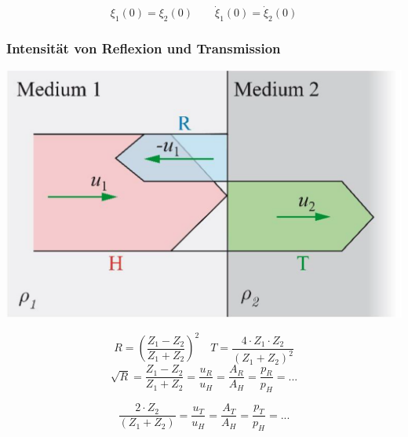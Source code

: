 $$ \xi_1(0) = \xi_2(0) \qquad \dot{\xi}_1(0) = \dot{\xi}_2(0) $$




\subsubsection{Intensität von Reflexion und Transmission}\label{Reflexionskoeffizient}

\begin{minipage}{0.48\linewidth}
	\includegraphics[width=0.9\linewidth]{Bilder/Wellen-Optik/reflexionskoeffizient_transmissionskoeffizient} \\
\end{minipage}
\hfill
\begin{minipage}{0.48\linewidth}
	$$ \boxed{ R = \left(  \frac{Z_1 - Z_2}{Z_1 + Z_2}  \right)^2  }  \quad \boxed{ T = \frac{ 4 \cdot Z_1 \cdot Z_2}{(Z_1 + Z_2)^2}   }$$
	$$ \boxed{ \sqrt{R} = \frac{Z_1 - Z_2}{Z_1 + Z_2} = \frac{u_R}{u_H} = \frac{A_R}{A_H} = \frac{p_R}{p_H} = ...} $$

	$$ \boxed{ \frac{2 \cdot Z_2}{(Z_1 + Z_2)}  = \frac{u_T}{u_H} = \frac{A_T}{A_H} = \frac{p_T}{p_H} = ... } $$
\end{minipage}

\vspace{0.2cm}



